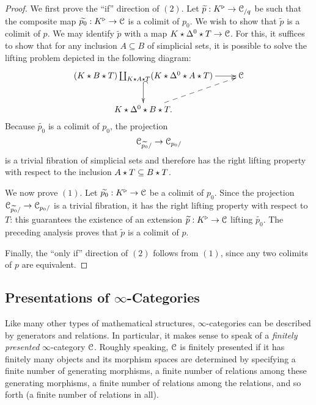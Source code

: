 \begin{Didn't Read}
\begin{proposition}
\begin{itemize}
\end{itemize}
\end{proposition}

\begin{proof}
We first prove the ``if'' direction of $(2)$. Let $\widetilde{p}: K^{\triangleright} \rightarrow \operatorname{\mathcal{C}}_{/q}$ be such that the composite map $\widetilde{p_0}: K^{\triangleright} \rightarrow \operatorname{\mathcal{C}}$ is a colimit of $p_0$. We wish to show that $\widetilde{p}$ is a colimit of $p$. We may identify $\widetilde{p}$ with a map $K \star \Delta^0 \star T \rightarrow \operatorname{\mathcal{C}}$. For this, it suffices to show that
for any inclusion $A \subseteq B$ of simplicial sets, it is possible to solve the lifting problem depicted in the following diagram:
$$ \xymatrix{ (K \join B \join T) \coprod_{ K \join A \join T} ( K \join \Delta^0 \join A \join T )
\ar@{^{(}->}[d] \ar[r] & \calC \\
K \join \Delta^0 \join B \join T. \ar@{-->}[ur] & }$$
Because $\widetilde{p_0}$ is a colimit of $p_0$, the projection
$$ \operatorname{\mathcal{C}}_{\widetilde{p_0}/} \rightarrow \operatorname{\mathcal{C}}_{p_0/}$$ is a trivial fibration of simplicial
sets and therefore has the right lifting property with respect to the inclusion
$A \star T \subseteq B \star T$.

We now prove $(1)$. Let $\widetilde{p_0}: K^{\triangleright} \rightarrow \operatorname{\mathcal{C}}$ be a colimit of $p_0$.
Since the projection $\operatorname{\mathcal{C}}_{\widetilde{p_0}/} \rightarrow \operatorname{\mathcal{C}}_{p_0/}$ is a trivial fibration, it has the right lifting property with respect to $T$: this guarantees the existence of an extension
$\widetilde{p}: K^{\triangleright} \rightarrow \operatorname{\mathcal{C}}$ lifting $\widetilde{p_0}$. The preceding analysis proves that $\widetilde{p}$ is a colimit of $p$.

Finally, the ``only if'' direction of $(2)$ follows from $(1)$, since any two colimits of $p$ are equivalent.
\end{proof}

\subsection{Presentations of $\infty$-Categories}

Like many other types of mathematical structures, $\infty$-categories can be described by generators and relations. In particular, it makes sense to speak of a {\it
finitely presented} $\infty$-category $\operatorname{\mathcal{C}}$. Roughly speaking, $\operatorname{\mathcal{C}}$ is finitely presented
if it has finitely many objects and its morphism spaces are determined
by specifying a finite number of generating morphisms, a finite
number of relations among these generating morphisms, a finite
number of relations among the relations, and so forth (a finite
number of relations in all).


\end{Didn't Read}
